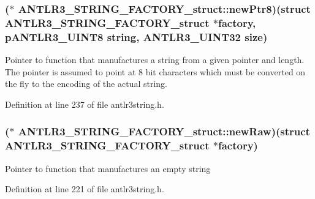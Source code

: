 \hypertarget{struct_a_n_t_l_r3___s_t_r_i_n_g___f_a_c_t_o_r_y__struct_aa8e840afaab19629b182b152b6b203eb}{
\subsubsection[{new\-Ptr8}]{($\ast$ A\-N\-T\-L\-R3\-\_\-\-S\-T\-R\-I\-N\-G\-\_\-\-F\-A\-C\-T\-O\-R\-Y\-\_\-struct\-::new\-Ptr8)(struct {\bf A\-N\-T\-L\-R3\-\_\-\-S\-T\-R\-I\-N\-G\-\_\-\-F\-A\-C\-T\-O\-R\-Y\-\_\-struct} $\ast$factory, {\bf p\-A\-N\-T\-L\-R3\-\_\-\-U\-I\-N\-T8} string, {\bf A\-N\-T\-L\-R3\-\_\-\-U\-I\-N\-T32} {\bf size})}}\label{struct_a_n_t_l_r3___s_t_r_i_n_g___f_a_c_t_o_r_y__struct_aa8e840afaab19629b182b152b6b203eb}
Pointer to function that manufactures a string from a given pointer and length. The pointer is assumed to point at 8 bit characters which must be converted on the fly to the encoding of the actual string. 

Definition at line 237 of file antlr3string.\-h.

\hypertarget{struct_a_n_t_l_r3___s_t_r_i_n_g___f_a_c_t_o_r_y__struct_a5d26214a809d4218b4d733015599ce47}{
\subsubsection[{new\-Raw}]{($\ast$ A\-N\-T\-L\-R3\-\_\-\-S\-T\-R\-I\-N\-G\-\_\-\-F\-A\-C\-T\-O\-R\-Y\-\_\-struct\-::new\-Raw)(struct {\bf A\-N\-T\-L\-R3\-\_\-\-S\-T\-R\-I\-N\-G\-\_\-\-F\-A\-C\-T\-O\-R\-Y\-\_\-struct} $\ast$factory)}}\label{struct_a_n_t_l_r3___s_t_r_i_n_g___f_a_c_t_o_r_y__struct_a5d26214a809d4218b4d733015599ce47}
Pointer to function that manufactures an empty string 

Definition at line 221 of file antlr3string.\-h.

